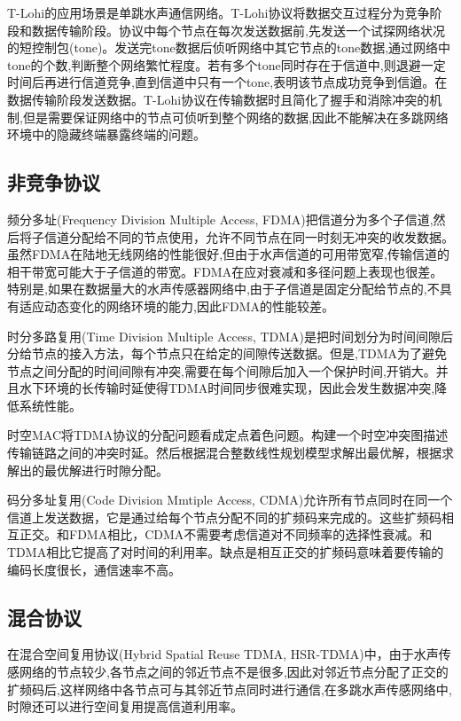 T-Lohi\cite{syed2008t}的应用场景是单跳水声通信网络。T-Lohi协议将数据交互过程分为竞争阶段和数据传输阶段。协议中每个节点在每次发送数据前,先发送一个试探网络状况的短控制包(tone)。发送完tone数据后侦听网络中其它节点的tone数据,通过网络中tone的个数,判断整个网络繁忙程度。若有多个tone同时存在于信道中,则退避一定时间后再进行信道竞争,直到信道中只有一个tone,表明该节点成功竞争到信遒。在数据传输阶段发送数据。T-Lohi协议在传输数据时且简化了握手和消除冲突的机制,但是需要保证网络中的节点可侦听到整个网络的数据,因此不能解决在多跳网络环境中的隐藏终端暴露终端的问题。

\subsection{非竞争协议}
频分多址(Frequency Division Multiple Access, FDMA)把信道分为多个子信道,然后将子信道分配给不同的节点使用，允许不同节点在同一时刻无冲突的收发数据。虽然FDMA在陆地无线网络的性能很好,但由于水声信道的可用带宽窄,传输信道的相干带宽可能大于子信道的带宽。FDMA在应对衰减和多径问题上表现也很差。特别是,如果在数据量大的水声传感器网络中,由于子信道是固定分配给节点的,不具有适应动态变化的网络环境的能力,因此FDMA的性能较差。

时分多路复用(Time Division Multiple Access, TDMA)是把时间划分为时间间隙后分给节点的接入方法，每个节点只在给定的间隙传送数据。但是,TDMA为了避免节点之间分配的时间间隙有冲突,需要在每个间隙后加入一个保护时间,开销大。并且水下环境的长传输时延使得TDMA时间同步很难实现，因此会发生数据冲突,降低系统性能。

时空MAC将TDMA协议的分配问题看成定点着色问题。构建一个时空冲突图描述传输链路之间的冲突时延。然后根据混合整数线性规划模型求解出最优解，根据求解出的最优解进行时隙分配。

码分多址复用(Code Division Mmtiple Access, CDMA)允许所有节点同时在同一个信道上发送数据，它是通过给每个节点分配不同的扩频码来完成的。这些扩频码相互正交。和FDMA相比，CDMA不需要考虑信道对不同频率的选择性衰减。和TDMA相比它提高了对时间的利用率。缺点是相互正交的扩频码意味着要传输的编码长度很长，通信速率不高。

\subsection{混合协议}
在混合空间复用协议(Hybrid Spatial Reuse TDMA, HSR-TDMA)\cite{diamant2011spatial}中，由于水声传感网络的节点较少,各节点之间的邻近节点不是很多,因此对邻近节点分配了正交的扩频码后,这样网络中各节点可与其邻近节点同时进行通信,在多跳水声传感网络中,时隙还可以进行空间复用提高信道利用率。

